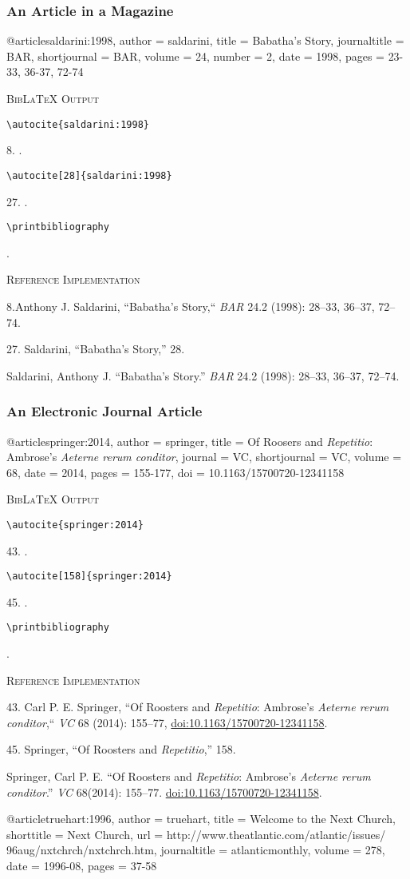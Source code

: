 \documentclass[a4paper]{article}
\newcommand\citetestnpf[4]{%
  {\textsc{BibLaTeX Output}\par
   \nobreak
   \texttt{\textbackslash autocite\{#4\}}\par
   \color{biblatex-colour}
   #1. \cite{#4}.\par
   \color{black}
   \texttt{\textbackslash autocite[#3]\{#4\}}\par
   \color{biblatex-colour}
   #2. \cite[#3]{#4}.\par
   \color{black}
   \texttt{\textbackslash printbibliography}\par
   \color{biblatex-colour}
   \hangindent\bibindent\bibentrycite{#4}.\par}}
\newenvironment{refimp}{%
  \begin{minipage}{\linewidth}
    \setlength{\parskip}{1ex}
    \textsc{Reference Implementation}\par
    \nobreak
    \color{reference-colour}
}{\end{minipage}}
\newenvironment{vb}{%
  \setlength{\parskip}{0pt}
  \verbatim}{\endverbatim}
\begin{document}
\subsubsection{An Article in a Magazine}

\begin{vb}
@article{saldarini:1998,
  author = saldarini,
  title = {Babatha's Story},
  journaltitle = BAR,
  shortjournal = {BAR},
  volume = {24},
  number = {2},
  date = {1998},
  pages = {23-33, 36-37, 72-74}
}
\end{vb}  

\citetestnpf{8}{27}{28}{saldarini:1998}

\begin{refimp}
  8.Anthony J. Saldarini, “Babatha’s Story,“ \emph{BAR} 24.2 (1998): 28–33,
  36–37, 72–74.

  27. Saldarini, “Babatha’s Story,” 28.

 \hangindent\bibindent Saldarini, Anthony J. “Babatha’s Story.” \emph{BAR}
 24.2 (1998): 28–33, 36–37, 72–74.
\end{refimp}

\subsubsection{An Electronic Journal Article}

\begin{vb}
@article{springer:2014,
  author = springer,
  title = {Of Roosers and \emph{Repetitio}: Ambrose’s
           \emph{Aeterne rerum conditor}},
  journal = VC,
  shortjournal = {VC},
  volume = {68},
  date = {2014},
  pages = {155-177},
  doi = {10.1163/15700720-12341158}
}
\end{vb}

\citetestnpf{43}{45}{158}{springer:2014}

\begin{refimp}
  43. Carl P. E. Springer, “Of Roosters and \emph{Repetitio}: Ambrose’s
  \emph{Aeterne rerum conditor},“ \emph{VC} 68 (2014): 155–77,
  \url{doi:10.1163/15700720-12341158}.

  45. Springer, “Of Roosters and \emph{Repetitio},” 158.

  \hangindent\bibindent Springer, Carl P. E. “Of Roosters and
  \emph{Repetitio}: Ambrose’s \emph{Aeterne rerum conditor}.” \emph{VC}
  68(2014): 155–77. \url{doi:10.1163/15700720-12341158}.
\end{refimp}

\begin{vb}
@article{truehart:1996,
  author = truehart,
  title = {Welcome to the Next Church},
  shorttitle = {Next Church},
  url = {http://www.theatlantic.com/atlantic/issues/
         96aug/nxtchrch/nxtchrch.htm},
  journaltitle = atlanticmonthly,
  volume = {278},
  date = {1996-08},
  pages = {37-58}
}
\end{vb}
\end{document}
